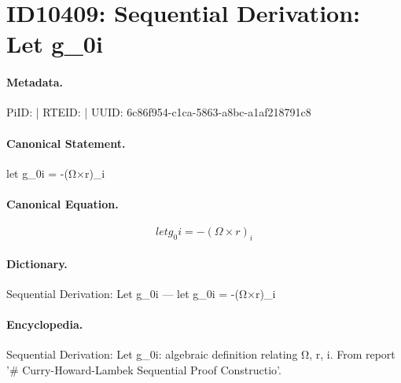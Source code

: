 \section*{ID10409: Sequential Derivation: Let g\_0i}
\paragraph{Metadata.}
PiID:  | RTEID:  | UUID: 6c86f954-c1ca-5863-a8bc-a1af218791c8

\paragraph{Canonical Statement.}
let g\_0i = -(Ω×r)\_i

\paragraph{Canonical Equation.}
\[
let g_0i = -(Ω×r)_i
\]

\paragraph{Dictionary.}
Sequential Derivation: Let g\_0i — let g\_0i = -(Ω×r)\_i

\paragraph{Encyclopedia.}
Sequential Derivation: Let g\_0i: algebraic definition relating Ω, r, i. From report '\# Curry-Howard-Lambek Sequential Proof Constructio'.
